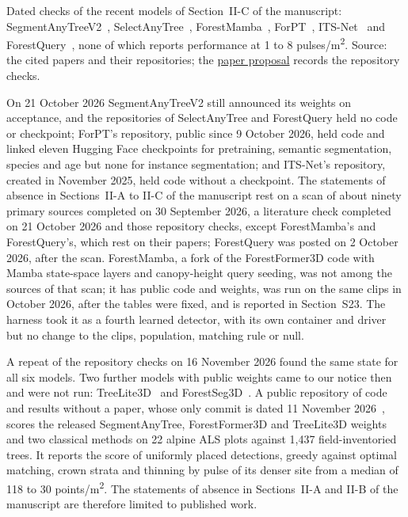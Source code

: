 \documentclass[10pt]{article}
\makeatletter
\newcommand\suppFloatBarrier{\par\addpenalty\z@
  \ifx\@deferlist\@empty\else\expandafter\supp@flush\fi}
\newcommand\supp@flush{\let\supp@waiting\@deferlist
  \newpage
  \ifx\@deferlist\supp@waiting\null\newpage\fi
  \ifx\@deferlist\supp@waiting\expandafter\clearpage\else\expandafter\suppFloatBarrier\fi}
\gdef\supp@afterheading{}
\renewcommand\section{\suppFloatBarrier
    \gdef\supp@afterheading{\suppressfloats[t]\gdef\supp@afterheading{}}\supp@section}}
\makeatother
\begin{document}
\section*{S24. Repository Checks of Recent Models}

Dated checks of the recent models of Section~II-C of the manuscript:
SegmentAnyTreeV2~\cite{wielgosz2026segmentanytreev2}, SelectAnyTree~\cite{nguyen2026selectanytree}, ForestMamba~\cite{nguyen2026forestmamba}, ForPT~\cite{yue2026toward}, ITS-Net~\cite{li2026itsnet} and ForestQuery~\cite{zhan2026forestquery}, none of which reports performance at 1 to 8 pulses/m\textsuperscript{2}.
Source: the cited papers and their repositories; the \href{https://github.com/devakellc/lidar-tree-benchmark/blob/main/docs/paper-proposal.md}{paper
proposal} records the repository checks.

On 21 October 2026 SegmentAnyTreeV2 still announced its weights on acceptance,
and the repositories of SelectAnyTree and ForestQuery held no code or
checkpoint; ForPT's repository, public since 9 October 2026, held code and
linked eleven Hugging Face checkpoints for pretraining, semantic segmentation,
species and age but none for instance segmentation; and ITS-Net's repository,
created in November 2025, held code without a checkpoint. The statements of
absence in Sections~II-A to II-C of the manuscript rest on a scan of about ninety
primary sources completed on 30 September 2026, a literature check completed on
21 October 2026 and those repository checks, except ForestMamba's and
ForestQuery's, which rest on their papers; ForestQuery was posted on 2 October
2026, after the scan. ForestMamba, a fork of the ForestFormer3D code with Mamba
state-space layers and canopy-height query seeding, was not among the sources of
that scan; it has public code and weights, was run on the same clips in October
2026, after the tables were fixed, and is reported in Section~S23. The harness
took it as a fourth learned detector, with its own container and driver but no
change to the clips, population, matching rule or null.

A repeat of the repository checks on 16 November 2026 found the same state for
all six models. Two further models with public weights came to our notice then
and were not run: TreeLite3D~\cite{rizaldy2026labelefficient} and ForestSeg3D~\cite{zhang2026forestseg3d}. A public repository of code and results without a
paper, whose only commit is dated 11 November 2026~\cite{mallacampoverde2026pretrained}, scores the released SegmentAnyTree,
ForestFormer3D and TreeLite3D weights and two classical methods on 22 alpine ALS
plots against 1,437 field-inventoried trees. It reports the score of uniformly
placed detections, greedy against optimal matching, crown strata and thinning by
pulse of its denser site from a median of 118 to 30 points/m\textsuperscript{2}. The statements of
absence in Sections~II-A and II-B of the manuscript are therefore limited to
published work.
\end{document}
